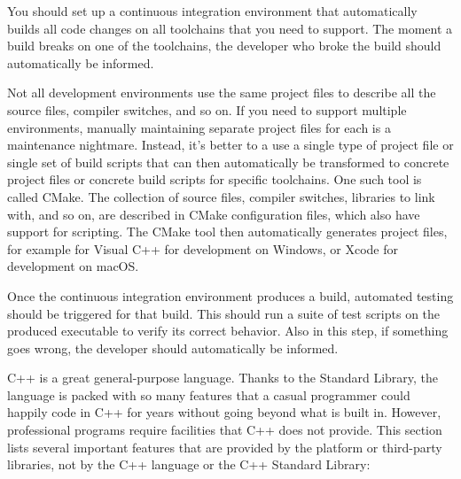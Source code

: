 You should set up a continuous integration environment that automatically builds all code changes on all toolchains that you need to support. The moment a build breaks on one of the toolchains, the developer who broke the build should automatically be informed.

Not all development environments use the same project files to describe all the source files, compiler switches, and so on. If you need to support multiple environments, manually maintaining separate project files for each is a maintenance nightmare. Instead, it’s better to a use a single type of project file or single set of build scripts that can then automatically be transformed to concrete project files or concrete build scripts for specific toolchains. One such tool is called CMake. The collection of source files, compiler switches, libraries to link with, and so on, are described in CMake configuration files, which also have support for scripting. The CMake tool then automatically generates project files, for example for Visual C++ for development on Windows, or Xcode for development on macOS.

Once the continuous integration environment produces a build, automated testing should be triggered for that build. This should run a suite of test scripts on the produced executable to verify its correct behavior. Also in this step, if something goes wrong, the developer should automatically be informed.


C++ is a great general-purpose language. Thanks to the Standard Library, the language is packed with so many features that a casual programmer could happily code in C++ for years without going beyond what is built in. However, professional programs require facilities that C++ does not provide. This section lists several important features that are provided by the platform or third-party libraries, not by the C++ language or the C++ Standard Library:

